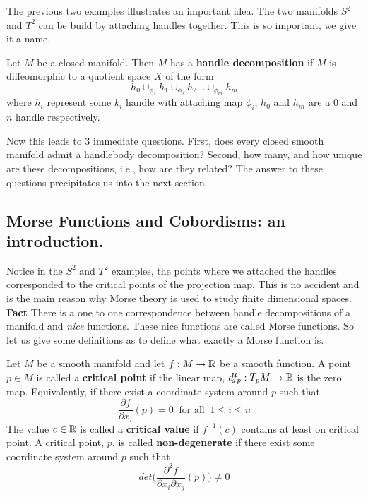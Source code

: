 The previous two examples illustrates an important idea. The two manifolds $S^{2}$ and $T^{2}$ can be build by attaching handles together. This is so important, we give it a name.
\begin{definition}
Let $M$ be a closed manifold. Then $M$ has a \textbf{handle decomposition} if $M$ is diffeomorphic to a quotient space $X$ of the form
\[
h_{0}\cup_{\phi_{1}}h_{1}\cup_{\phi_{2}}h_{2}...\cup_{\phi_{m}}h_{m}
\]
where $h_{i}$ represent some $k_{i}$ handle with attaching map $\phi_{i}$, $h_{0}$ and $h_{m}$ are a 0 and $n$ handle respectively.
\end{definition}
Now this leads to 3 immediate questions. First, does every closed smooth manifold admit a handlebody decomposition? Second, how many, and how unique are these decompositions, i.e., how are they related? The answer to these questions precipitates us into the next section.

\subsection{Morse Functions and Cobordisms: an introduction.}
Notice in the $S^{2}$ and $T^{2}$ examples, the points where we attached the handles corresponded to the critical points of the projection map. This is no accident and is the main reason why Morse theory is used to study finite dimensional spaces. \textbf{Fact} There is a one to one correspondence between handle decompositions of a manifold and \textit{nice} functions. These nice functions are called Morse functions. So let us give some definitions as to define what exactly a Morse function is.

\begin{definition}
Let $M$ be a smooth manifold and let $f:M\rightarrow \mathbb{R}$ be a smooth function. A point $p\in M$ is called a \textbf{critical point} if the linear map, $df_{p}:T_{p}M\rightarrow \mathbb{R}$ is the zero map. Equivalently, if there exist a coordinate system around $p$ such that 
\[
\frac{\partial f}{\partial x_{i}}(p) =0 ~ \text{ for all }~1\leq i \leq n
\]
The value $c\in \mathbb{R}$ is called a \textbf{critical value} if $f^{-1}(c)$ contains at least on critical point. A critical point, $p$, is called \textbf{non-degenerate} if there exist some coordinate system around $p$ such that 
\[
det\bigg( \frac{\partial^{2} f}{\partial x_{i}{\partial x_{j}}}(p)\bigg)\neq 0
\]
\end{definition}